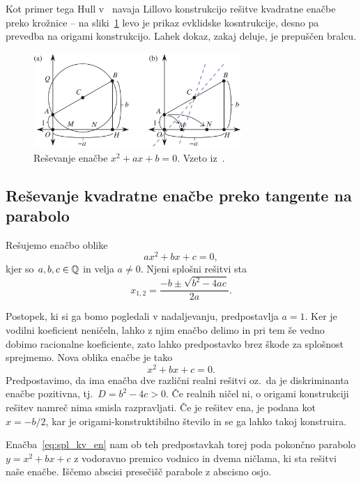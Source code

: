 Kot primer tega Hull v~\cite[str.\ 38]{hull2020} navaja Lillovo konstrukcijo rešitve kvadratne enačbe preko krožnice -- na sliki~\ref{fig:par_primer_hull_lill} levo je prikaz evklidske kosntrukcije, desno pa prevedba na origami konstrukcijo. Lahek dokaz, zakaj deluje, je prepuščen bralcu.

\begin{figure}[h]
    \centering
    \includegraphics[width=0.7\textwidth]{images/kvadratna_enacba/primer_hull_lill.png}
    \caption[Primer reševanja kvadratne enačbe z evklidskim orodjem]{Reševanje enačbe $x^2 + ax + b = 0$. Vzeto iz~\cite[str.\ 38]{hull2020}.}
    \label{fig:par_primer_hull_lill}
\end{figure}

\subsection{Reševanje kvadratne enačbe preko tangente na parabolo}
\label{podpogl:kvadratna_enacba}

Rešujemo enačbo oblike
$$ a x^2 + b x + c = 0, $$
kjer so $a, b, c \in \mathbb Q$ in velja $a \neq 0$.  Njeni splošni rešitvi sta
$$ x_{1,2} = \frac{-b \pm \sqrt{b^2 - 4ac}}{2a}.$$

Postopek, ki si ga bomo pogledali v nadaljevanju, predpostavlja $a = 1$. Ker je vodilni koeficient neničeln, lahko z njim enačbo delimo in pri tem še vedno dobimo racionalne koeficiente, zato lahko predpostavko brez škode za splošnost sprejmemo. Nova oblika enačbe je tako
\begin{equation}
    \label{eq:spl_kv_en}
    x^2 + bx + c = 0.
\end{equation}
Predpostavimo, da ima enačba dve različni realni rešitvi oz.\ da je diskriminanta enačbe pozitivna, tj.\ $D = b^2 - 4c > 0$. Če realnih ničel ni, o origami konstrukciji rešitev namreč nima smisla razpravljati. Če je rešitev ena, je podana kot $x = -b/2$, kar je origami-konstruktibilno število in se ga lahko takoj konstruira.

Enačba~\ref{eq:spl_kv_en} nam ob teh predpostavkah torej poda pokončno parabolo $y = x^2 + bx + c$ z vodoravno premico vodnico in dvema ničlama, ki sta rešitvi naše enačbe. Iščemo abscisi presečišč parabole z abscisno osjo.

